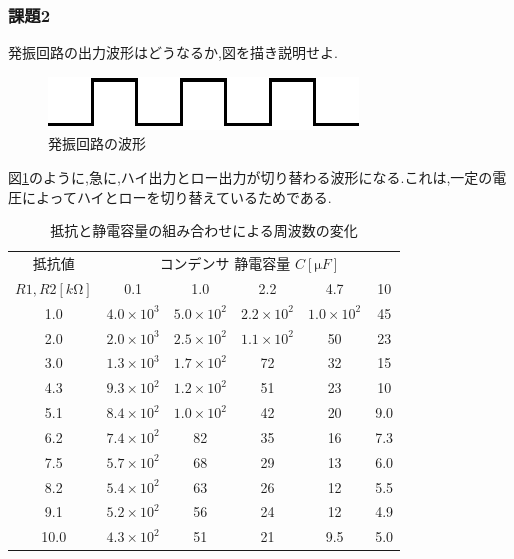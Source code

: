 \documentclass[uplatex]{jsarticle}
\begin{document}
    \subsubsection*{課題2}
        発振回路の出力波形はどうなるか,図を描き説明せよ.\par
        \begin{figure}[h]
            \begin{center}
                \includegraphics{3.eps}
                \caption{発振回路の波形}
                \label{発振回路の波形}
            \end{center}
        \end{figure}
        図\ref{発振回路の波形}のように,急に,ハイ出力とロー出力が切り替わる波形になる.これは,一定の電圧によってハイとローを切り替えているためである.
    \begin{table}[h]
        \caption{抵抗と静電容量の組み合わせによる周波数の変化}
        \label{抵抗と静電容量の組み合わせによる周波数の変化}
        \begin{center}
            \begin{tabular}{c|c|c|c|c|c}\hline
                抵抗値 & \multicolumn{5}{|c}{コンデンサ 静電容量 $C [\mathrm \mu F]$} \\ \cline{2-6}
                $R1,R2[k \mathrm \Omega]$ & 0.1 & 1.0 & 2.2 & 4.7 & 10 \\ \hline
                1.0 & $4.0 \times 10^{3}$ & $5.0 \times 10^{2}$ & $2.2 \times 10^{2}$ & $1.0 \times 10^{2}$ & 45 \\ \hline
                2.0 & $2.0 \times 10^{3}$ & $2.5 \times 10^{2}$ & $1.1 \times 10^{2}$ & 50 & 23 \\ \hline
                3.0 & $1.3 \times 10^{3}$ & $1.7 \times 10^{2}$ & 72 & 32 & 15 \\ \hline
                4.3 & $9.3 \times 10^{2}$ & $1.2 \times 10^{2}$ & 51 & 23 & 10 \\ \hline
                5.1 & $8.4 \times 10^{2}$ & $1.0 \times 10^{2}$ & 42 & 20 & 9.0 \\ \hline
                6.2 & $7.4 \times 10^{2}$ & 82 & 35 & 16 & 7.3 \\ \hline
                7.5 & $5.7 \times 10^{2}$ & 68 & 29 & 13 & 6.0 \\ \hline
                8.2 & $5.4 \times 10^{2}$ & 63 & 26 & 12 & 5.5 \\ \hline
                9.1 & $5.2 \times 10^{2}$ & 56 & 24 & 12 & 4.9 \\ \hline
                10.0 & $4.3 \times 10^{2}$ & 51 & 21 & 9.5 & 5.0 \\ \hline
            \end{tabular}
        \end{center}
    \end{table}
\end{document}
